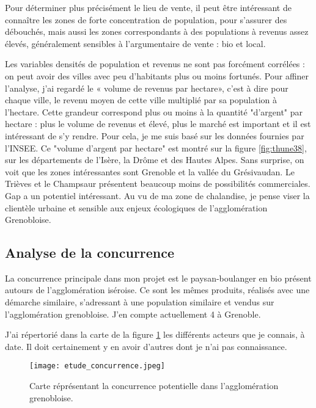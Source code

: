 \documentclass{book}
\begin{document}
Pour déterminer plus précisément le lieu de vente, il peut être intéressant de connaître les zones de forte concentration de population, pour s’assurer des débouchés, mais aussi les zones correspondants à des populations à revenus assez élevés, généralement sensibles à l’argumentaire de vente : bio et local. 

Les variables densités de population et revenus ne sont pas forcément corrélées : on peut avoir des villes avec peu d’habitants plus ou moins fortunés. Pour affiner l'analyse, j’ai regardé le « volume de revenus par hectare», c’est à dire pour chaque ville, le revenu moyen de cette ville multiplié par sa population à l’hectare. Cette grandeur correspond plus ou moins à la quantité "d'argent" par hectare : plus le volume de revenus et élevé, plus le marché est important et il est intéressant de s'y rendre. Pour cela, je me suis basé sur les données fournies par l’INSEE. Ce "volume d’argent par hectare" est montré sur la figure \ref{fig:thune38}, sur les départements de l’Isère, la Drôme et des Hautes Alpes. Sans surprise, on voit que les zones intéressantes sont Grenoble et la vallée du Grésivaudan. Le Trièves et le Champsaur présentent beaucoup moins de possibilités commerciales. Gap a un potentiel intéressant. Au vu de ma zone de chalandise, je pense viser la clientèle urbaine et sensible aux enjeux écologiques de l’agglomération Grenobloise.

\subsection{Analyse de la concurrence}

La concurrence principale dans mon projet est le paysan-boulanger en bio présent autours de l’agglomération iséroise. Ce sont les mêmes produits, réalisés avec une démarche similaire, s’adressant à une population similaire et vendus sur l’agglomération grenobloise. J’en compte actuellement 4 à Grenoble.

J’ai répertorié dans la carte de la figure \ref{fig:concurrence} les différents acteurs que je connais, à date. Il doit certainement y en avoir d’autres dont je n’ai pas connaissance. 

\begin{figure}[h!]
\begin{center}
	\texttt{[image: etude\_concurrence.jpeg]}
	\caption{Carte réprésentant la concurrence potentielle dans l'agglomération grenobloise.}
	\label{fig:concurrence}
\end{center}
\end{figure}
\end{document}
